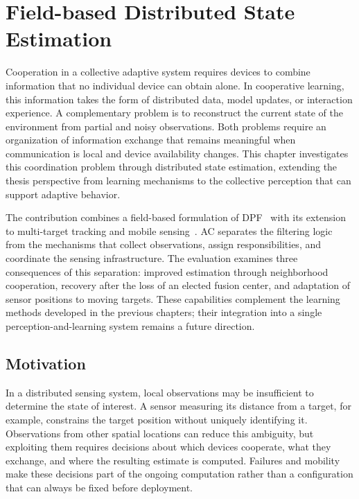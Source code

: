 \chapter{Field-based Distributed State Estimation}
\label{ch:distributed-state-estimation}

Cooperation in a collective adaptive system requires devices 
 to combine information that no individual device can obtain alone.
%
In cooperative learning, 
 this information takes the form of distributed data, 
 model updates, or interaction experience.
%
A complementary problem is to reconstruct the current state 
 of the environment from partial and noisy observations.
%
Both problems require an organization of information exchange that remains meaningful when communication is local 
 and device availability changes.
%
This chapter investigates this coordination problem through distributed state estimation, 
 extending the thesis perspective from learning mechanisms to the collective perception that can support adaptive behavior.

The contribution combines a field-based formulation of \gls{DPF}~\cite{DBLP:journals/corr/abs-2606-18483} 
 with its extension to multi-target tracking and mobile sensing~\cite{DBLP:conference/acsos/CortecchiaDCCV}.
%
\gls{AC} separates the filtering logic from the mechanisms that collect observations, 
 assign responsibilities, and coordinate the sensing infrastructure.
%
The evaluation examines three consequences of this separation: 
 improved estimation through neighborhood cooperation, recovery after the loss of an elected fusion center, 
 and adaptation of sensor positions to moving targets.
%
These capabilities complement the learning methods developed in the previous chapters; 
 their integration into a single perception-and-learning system remains a future direction.

\section{Motivation}
\label{sec:dpf-motivation}

In a distributed sensing system, 
 local observations may be insufficient to determine the state of interest.
%
A sensor measuring its distance from a target, for example, 
 constrains the target position without uniquely identifying it.
%
Observations from other spatial locations can reduce this ambiguity, 
 but exploiting them requires decisions about which devices cooperate, what they exchange, 
 and where the resulting estimate is computed.
%
Failures and mobility make these decisions part of the ongoing computation rather than a configuration 
 that can always be fixed before deployment.

